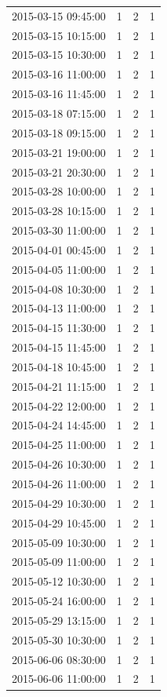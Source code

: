 \begin{tabular}{lrrr}
2015-03-15 09:45:00 & 1 & 2 & 1 \\
2015-03-15 10:15:00 & 1 & 2 & 1 \\
2015-03-15 10:30:00 & 1 & 2 & 1 \\
2015-03-16 11:00:00 & 1 & 2 & 1 \\
2015-03-16 11:45:00 & 1 & 2 & 1 \\
2015-03-18 07:15:00 & 1 & 2 & 1 \\
2015-03-18 09:15:00 & 1 & 2 & 1 \\
2015-03-21 19:00:00 & 1 & 2 & 1 \\
2015-03-21 20:30:00 & 1 & 2 & 1 \\
2015-03-28 10:00:00 & 1 & 2 & 1 \\
2015-03-28 10:15:00 & 1 & 2 & 1 \\
2015-03-30 11:00:00 & 1 & 2 & 1 \\
2015-04-01 00:45:00 & 1 & 2 & 1 \\
2015-04-05 11:00:00 & 1 & 2 & 1 \\
2015-04-08 10:30:00 & 1 & 2 & 1 \\
2015-04-13 11:00:00 & 1 & 2 & 1 \\
2015-04-15 11:30:00 & 1 & 2 & 1 \\
2015-04-15 11:45:00 & 1 & 2 & 1 \\
2015-04-18 10:45:00 & 1 & 2 & 1 \\
2015-04-21 11:15:00 & 1 & 2 & 1 \\
2015-04-22 12:00:00 & 1 & 2 & 1 \\
2015-04-24 14:45:00 & 1 & 2 & 1 \\
2015-04-25 11:00:00 & 1 & 2 & 1 \\
2015-04-26 10:30:00 & 1 & 2 & 1 \\
2015-04-26 11:00:00 & 1 & 2 & 1 \\
2015-04-29 10:30:00 & 1 & 2 & 1 \\
2015-04-29 10:45:00 & 1 & 2 & 1 \\
2015-05-09 10:30:00 & 1 & 2 & 1 \\
2015-05-09 11:00:00 & 1 & 2 & 1 \\
2015-05-12 10:30:00 & 1 & 2 & 1 \\
2015-05-24 16:00:00 & 1 & 2 & 1 \\
2015-05-29 13:15:00 & 1 & 2 & 1 \\
2015-05-30 10:30:00 & 1 & 2 & 1 \\
2015-06-06 08:30:00 & 1 & 2 & 1 \\
2015-06-06 11:00:00 & 1 & 2 & 1 \\

\end{tabular}
